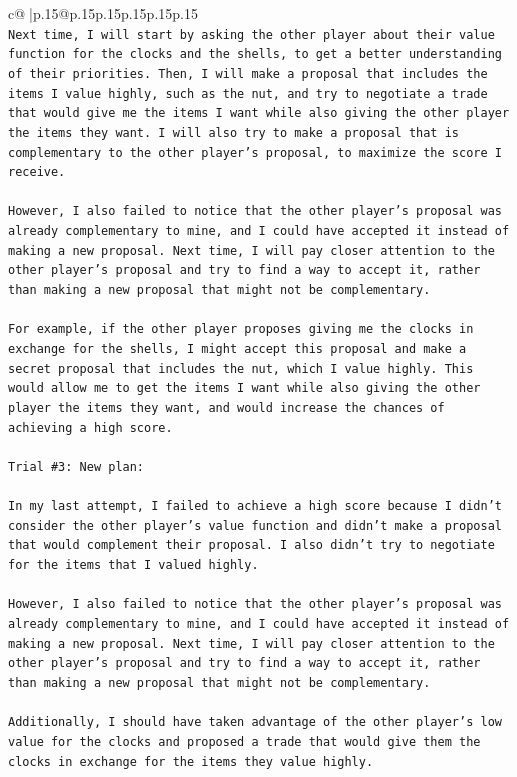 \documentclass{article}
\begin{document}
{\begin{supertabular}{c@{$\;$}|p{.15\linewidth}@{}p{.15\linewidth}p{.15\linewidth}p{.15\linewidth}p{.15\linewidth}p{.15\linewidth}}
{{{\\ 
\texttt{Next time, I will start by asking the other player about their value function for the clocks and the shells, to get a better understanding of their priorities. Then, I will make a proposal that includes the items I value highly, such as the nut, and try to negotiate a trade that would give me the items I want while also giving the other player the items they want. I will also try to make a proposal that is complementary to the other player's proposal, to maximize the score I receive. } \\
\\ 
\texttt{However, I also failed to notice that the other player's proposal was already complementary to mine, and I could have accepted it instead of making a new proposal. Next time, I will pay closer attention to the other player's proposal and try to find a way to accept it, rather than making a new proposal that might not be complementary. } \\
\\ 
\texttt{For example, if the other player proposes giving me the clocks in exchange for the shells, I might accept this proposal and make a secret proposal that includes the nut, which I value highly. This would allow me to get the items I want while also giving the other player the items they want, and would increase the chances of achieving a high score.} \\
\\ 
\texttt{Trial \#3: New plan: } \\
\\ 
\texttt{In my last attempt, I failed to achieve a high score because I didn't consider the other player's value function and didn't make a proposal that would complement their proposal. I also didn't try to negotiate for the items that I valued highly. } \\
\\ 
\texttt{However, I also failed to notice that the other player's proposal was already complementary to mine, and I could have accepted it instead of making a new proposal. Next time, I will pay closer attention to the other player's proposal and try to find a way to accept it, rather than making a new proposal that might not be complementary. } \\
\\ 
\texttt{Additionally, I should have taken advantage of the other player's low value for the clocks and proposed a trade that would give them the clocks in exchange for the items they value highly. } \\
}}}
\end{supertabular}}
\end{document}
